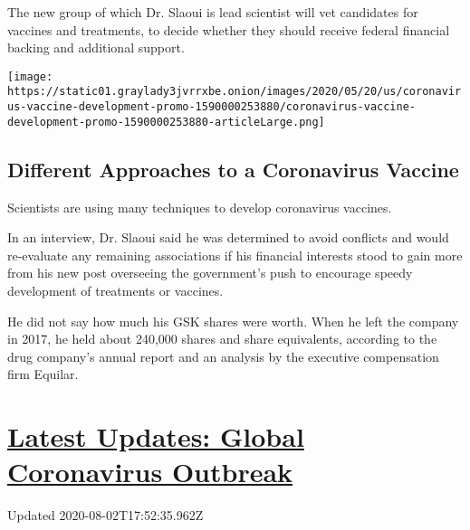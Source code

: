 The new group of which Dr. Slaoui is lead scientist will vet candidates
for vaccines and treatments, to decide whether they should receive
federal financial backing and additional support.

\href{https://www.nytimes3xbfgragh.onion/interactive/2020/05/20/science/coronavirus-vaccine-development.html}{}

\texttt{[image: https://static01.graylady3jvrrxbe.onion/images/2020/05/20/us/coronavirus-vaccine-development-promo-1590000253880/coronavirus-vaccine-development-promo-1590000253880-articleLarge.png]}

\hypertarget{different-approaches-to-a-coronavirus-vaccine}{%
\subsection{Different Approaches to a Coronavirus
Vaccine}\label{different-approaches-to-a-coronavirus-vaccine}}

Scientists are using many techniques to develop coronavirus vaccines.

In an interview, Dr. Slaoui said he was determined to avoid conflicts
and would re-evaluate any remaining associations if his financial
interests stood to gain more from his new post overseeing the
government's push to encourage speedy development of treatments or
vaccines.

He did not say how much his GSK shares were worth. When he left the
company in 2017, he held about 240,000 shares and share equivalents,
according to the drug company's annual report and an analysis by the
executive compensation firm Equilar.

\hypertarget{latest-updates-global-coronavirus-outbreak}{%
\section{\texorpdfstring{\href{https://www.nytimes3xbfgragh.onion/2020/08/01/world/coronavirus-covid-19.html?action=click\&pgtype=Article\&state=default\&region=MAIN_CONTENT_1\&context=storylines_live_updates}{Latest
Updates: Global Coronavirus
Outbreak}}{Latest Updates: Global Coronavirus Outbreak}}\label{latest-updates-global-coronavirus-outbreak}}

Updated 2020-08-02T17:52:35.962Z

